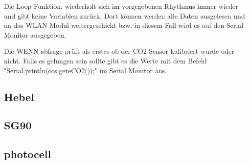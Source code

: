 Die Loop Funktion, wiederholt sich im vorgegebenen Rhythmus immer wieder und gibt keine Variablen zurück. Dort können werden alle Daten ausgelesen und an das WLAN Modul weitergeschickt bzw. in diesem Fall wird es auf den Serial Monitor ausgegeben.

Die WENN abfrage prüft als erstes ob der CO2 Sensor kalibriert wurde oder nicht. Falls es gelungen sein sollte gibt es die Werte mit dem Befehl "Serial.println(ccs.geteCO2());" im Serial Monitor aus.

\subsection{Hebel}

\subsection{SG90}

\subsection{photocell}


